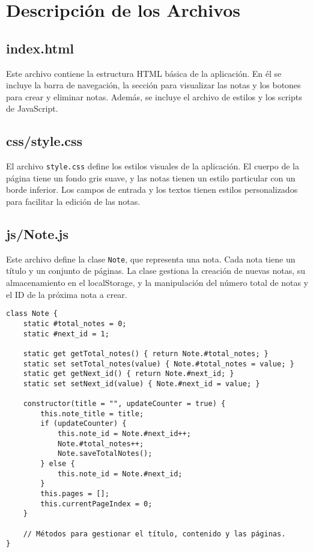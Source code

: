 \documentclass[a4paper,12pt]{report}
\begin{document}
\chapter{Descripción de los Archivos}

\section{index.html}

Este archivo contiene la estructura HTML básica de la aplicación. En él se incluye la barra de navegación, la sección para visualizar las notas y los botones para crear y eliminar notas. Además, se incluye el archivo de estilos y los scripts de JavaScript.

\section{css/style.css}

El archivo \texttt{style.css} define los estilos visuales de la aplicación. El cuerpo de la página tiene un fondo gris suave, y las notas tienen un estilo particular con un borde inferior. Los campos de entrada y los textos tienen estilos personalizados para facilitar la edición de las notas.

\section{js/Note.js}

Este archivo define la clase \texttt{Note}, que representa una nota. Cada nota tiene un título y un conjunto de páginas. La clase gestiona la creación de nuevas notas, su almacenamiento en el localStorage, y la manipulación del número total de notas y el ID de la próxima nota a crear.

\begin{verbatim}
class Note {
	static #total_notes = 0;
	static #next_id = 1;

	static get getTotal_notes() { return Note.#total_notes; }
	static set setTotal_notes(value) { Note.#total_notes = value; }
	static get getNext_id() { return Note.#next_id; }
	static set setNext_id(value) { Note.#next_id = value; }

	constructor(title = "", updateCounter = true) {
		this.note_title = title;
		if (updateCounter) {
			this.note_id = Note.#next_id++;
			Note.#total_notes++;
			Note.saveTotalNotes();
		} else {
			this.note_id = Note.#next_id;
		}
		this.pages = [];
		this.currentPageIndex = 0;
	}

	// Métodos para gestionar el título, contenido y las páginas.
}
\end{verbatim}
\end{document}
